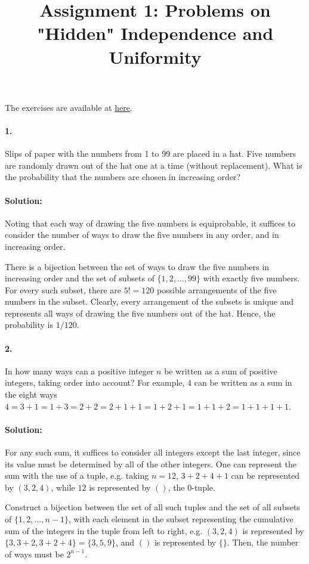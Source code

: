 \documentclass{article}
\begin{document}
\title{Assignment 1: Problems on "Hidden" Independence and Uniformity}
\maketitle

The exercises are available at \href{https://ocw.mit.edu/courses/mathematics/18-a34-mathematical-problem-solving-putnam-seminar-fall-2018/assignments/MIT18_A34F18PS1.pdf}{here}.

\paragraph{1.} Slips of paper with the numbers from 1 to 99 are placed in a
hat. Five numbers are randomly drawn out of the hat one at a time (without
replacement). What is the probability that the numbers are chosen in increasing
order?

\paragraph{Solution:} Noting that each way of drawing the five numbers is
equiprobable, it suffices to consider the number of ways to draw the five
numbers in any order, and in increasing order.

There is a bijection between the set of ways to draw the five numbers in
increasing order and the set of subsets of $\{1, 2, \ldots, 99\}$ with exactly
five numbers. For every such subset, there are $5! = 120$ possible arrangements
of the five numbers in the subset. Clearly, every arrangement of the subsets
is unique and represents all ways of drawing the five numbers out of the hat.
Hence, the probability is $1/120$.

\paragraph{2.} In how many ways can a positive integer $n$ be written as a sum
of positive integers, taking order into account? For example, 4 can be written
as a sum in the eight ways $4 = 3 + 1 = 1 + 3 = 2 + 2 = 2 + 1 + 1 = 1 + 2 + 1 =
1 + 1 + 2 = 1 + 1 + 1 + 1$.

\paragraph{Solution:} For any such sum, it suffices to consider all integers
except the last integer, since its value must be determined by all of the other
integers. One can represent the sum with the use of a tuple, e.g. taking $n =
12$, $3 + 2 + 4 + 1$ can be represented by $(3, 2, 4)$, while $12$ is
represented by $()$, the 0-tuple.

Construct a bijection between the set of all such tuples and the set of all
subsets of $\{1, 2, \ldots, n -  1\}$, with each element in the subset
representing the cumulative sum of the integers in the tuple from left to
right, e.g. $(3, 2, 4)$ is represented by $\{3, 3 + 2, 3 + 2 + 4\} = \{3, 5,
9\}$, and $()$ is represented by $\{\}$. Then, the number of ways must be
$2^{n - 1}$.
\end{document}
